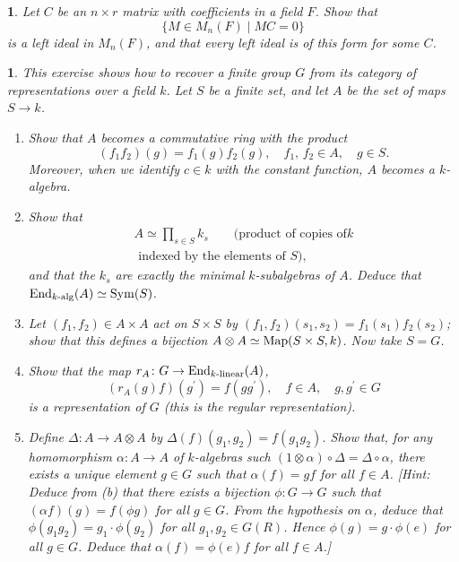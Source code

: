 \documentclass[a4paper,11pt,final,openany]{memoir}%
\newtheorem{exercise}[Y]{}
\theoremstyle{nonumberplain}
\begin{document}
\begin{exercise}
\label{x40}Let $C$ be an $n\times r$ matrix with coefficients in a field $F$.
Show that%
\[
\{M\in M_{n}(F)\mid MC=0\}
\]
is a left ideal in $M_{n}(F)$, and that every left ideal is of this form for
some $C$.
\end{exercise}

\begin{exercise}
\label{x41}This exercise shows how to recover a finite group $G$ from its
category of representations over a field $k$. Let $S$ be a finite set, and let
$A$ be the set of maps $S\rightarrow k$.

\begin{enumerate}
\item Show that $A$ becomes a commutative ring with the product%
\[
(f_{1}f_{2})(g)=f_{1}(g)f_{2}(g),\quad f_{1}\text{, }f_{2}\in A,\quad g\in S.
\]
Moreover, when we identify $c\in k$ with the constant function, $A$ becomes a
$k$-algebra.

\item Show that
\begin{align*}
A\simeq\prod\nolimits_{s\in S}k_{s}\quad\quad\text{(product of copies of
}k\\
\text{ indexed by the elements of }S\text{)},
\end{align*}
and that the $k_{s}$ are exactly the minimal $k$-subalgebras of $A$. Deduce
that $\operatorname{End}_{k\text{-alg}}(A)\simeq\operatorname{Sym}(S)$.

\item Let $(f_{1},f_{2})\in A\times A$ act on $S\times S$ by $(f_{1}%
,f_{2})(s_{1},s_{2})=f_{1}(s_{1})f_{2}(s_{2})$; show that this defines a
bijection $A\otimes A\simeq\operatorname{Map}(S\times S,k)$. Now take $S=G$.

\item Show that the map $r_{A}\colon G\rightarrow\operatorname{End}_{k\text{-linear}}(A)$,
\[
(r_{A}(g)f)(g^{\prime})=f(gg^{\prime}),\quad f\in A,\quad g,g^{\prime}\in G
\]
is a representation of $G$ (this is the regular representation).

\item Define $\Delta\colon A\rightarrow A\otimes A$ by $\Delta(f)(g_{1}%
,g_{2})=f(g_{1}g_{2})$. Show that, for any homomorphism $\alpha\colon
A\rightarrow A$ of $k$-algebras such $(1\otimes\alpha)\circ\Delta=\Delta
\circ\alpha$, there exists a unique element $g\in G$ such that $\alpha(f)=gf$
for all $f\in A$. [Hint: Deduce from (b) that there exists a bijection
$\phi\colon G\rightarrow G$ such that $\left(  \alpha f\right)  (g)=f(\phi g)$
for all $g\in G$. From the hypothesis on $\alpha$, deduce that $\phi
(g_{1}g_{2})=g_{1}\cdot\phi(g_{2})$ for all $g_{1},g_{2}\in G(R)$. Hence
$\phi(g)=g\cdot\phi(e)$ for all $g\in G$. Deduce that $\alpha(f)=\phi(e)f$ for
all $f\in A$.]


\end{enumerate}
\end{exercise}
\end{document}
